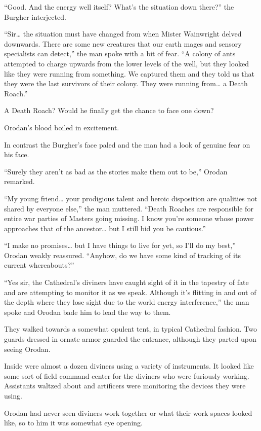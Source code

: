 \documentclass[a4paper,10pt]{book}
\begin{document}
“Good. And the energy well itself? What’s the situation down there?” the Burgher interjected.\par
“Sir… the situation must have changed from when Mister Wainwright delved downwards. There are some new creatures that our earth mages and sensory specialists can detect,” the man spoke with a bit of fear. “A colony of ants attempted to charge upwards from the lower levels of the well, but they looked like they were running from something. We captured them and they told us that they were the last survivors of their colony. They were running from… a Death Roach.”\par
A Death Roach? Would he finally get the chance to face one down?\par
Orodan’s blood boiled in excitement.\par
In contrast the Burgher’s face paled and the man had a look of genuine fear on his face.\par
“Surely they aren’t as bad as the stories make them out to be,” Orodan remarked.\par
“My young friend… your prodigious talent and heroic disposition are qualities not shared by everyone else,” the man muttered. “Death Roaches are responsible for entire war parties of Masters going missing. I know you’re someone whose power approaches that of the ancestor… but I still bid you be cautious.”\par
“I make no promises… but I have things to live for yet, so I’ll do my best,” Orodan weakly reassured. “Anyhow, do we have some kind of tracking of its current whereabouts?”\par
“Yes sir, the Cathedral’s diviners have caught sight of it in the tapestry of fate and are attempting to monitor it as we speak. Although it's flitting in and out of the depth where they lose sight due to the world energy interference,” the man spoke and Orodan bade him to lead the way to them.\par
They walked towards a somewhat opulent tent, in typical Cathedral fashion. Two guards dressed in ornate armor guarded the entrance, although they parted upon seeing Orodan.\par
Inside were almost a dozen diviners using a variety of instruments. It looked like some sort of field command center for the diviners who were furiously working. Assistants waltzed about and artificers were monitoring the devices they were using.\par
Orodan had never seen diviners work together or what their work spaces looked like, so to him it was somewhat eye opening.\par
\end{document}

